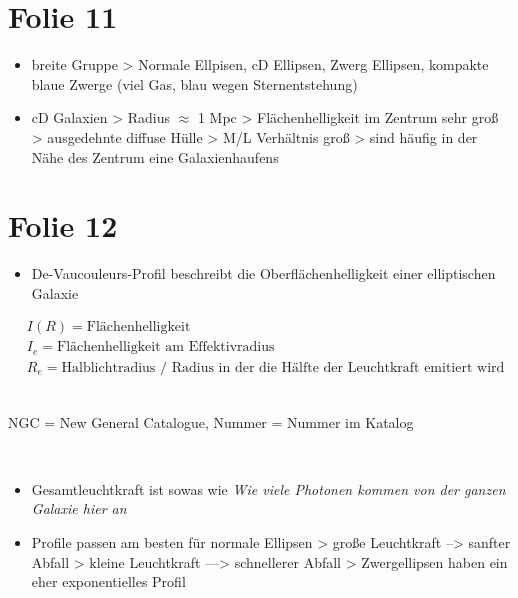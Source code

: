 \section{Folie 11}

\begin{itemize}
\item breite Gruppe
\subitem > Normale Ellpisen, cD Ellipsen, Zwerg Ellipsen, kompakte blaue Zwerge (viel Gas, blau wegen Sternentstehung)
\item cD Galaxien
\subitem > Radius $\approx$ 1 Mpc 
\subitem > Flächenhelligkeit im Zentrum sehr groß 
\subitem > ausgedehnte diffuse Hülle
\subitem > M/L Verhältnis groß 
\subitem > sind häufig in der Nähe des Zentrum eine Galaxienhaufens
\end{itemize}



\section{Folie 12}

\begin{itemize}
\item De-Vaucouleurs-Profil beschreibt die Oberflächenhelligkeit einer elliptischen Galaxie
\end{itemize}

\begin{align*}
&I(R) = \text{Flächenhelligkeit} \\
&I_e = \text{Flächenhelligkeit am Effektivradius} \\
&R_e = \text{Halblichtradius / Radius in der die Hälfte der Leuchtkraft emitiert wird}
\end{align*}

\hfill \\

NGC = New General Catalogue, Nummer = Nummer im Katalog

\hfill \\

\begin{itemize}
\item Gesamtleuchtkraft ist sowas wie \textit{Wie viele Photonen kommen von der ganzen Galaxie hier an}
\item Profile passen am besten für normale Ellipsen
\subitem > große Leuchtkraft --> sanfter Abfall
\subitem > kleine Leuchtkraft ---> schnellerer Abfall
\subitem > Zwergellipsen haben ein eher exponentielles Profil
\end{itemize}


